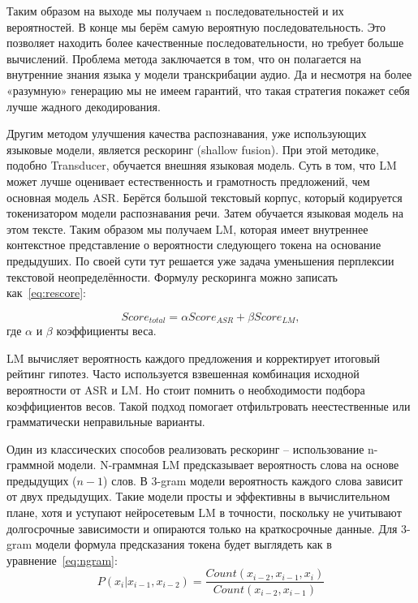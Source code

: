 Таким образом на выходе мы получаем n последовательностей и их вероятностей.
В конце мы берём самую вероятную последовательность.
Это позволяет находить более качественные последовательности, но требует больше вычислений.
Проблема метода заключается в том, что он полагается на внутренние знания языка у модели транскрибации аудио.
Да и несмотря на более «разумную» генерацию мы не имеем гарантий, что такая стратегия покажет себя лучше жадного декодирования.

Другим методом улучшения качества распознавания, уже использующих языковые модели, является рескоринг (shallow fusion)\cite{toshniwal2018comparison}.
При этой методике, подобно Transducer, обучается внешняя языковая модель.
Суть в том, что LM может лучше оценивает естественность и грамотность предложений, чем основная модель ASR.
Берётся большой текстовый корпус, который кодируется токенизатором модели распознавания речи.
Затем обучается языковая модель на этом тексте.
Таким образом мы получаем LM, которая имеет внутреннее контекстное представление о вероятности следующего токена на основание предыдуших.
По своей сути тут решается уже задача уменьшения перплексии текстовой неопределённости.
Формулу рескоринга можно записать как~\ref{eq:rescore}:

\begin{equation}
  Score_{total} = \alpha Score_{ASR} + \beta Score_{LM},
  \label{eq:rescore}
\end{equation}
где $\alpha$ и $\beta$ коэффициенты веса.

LM вычисляет вероятность каждого предложения и корректирует итоговый рейтинг гипотез.
Часто используется взвешенная комбинация исходной вероятности от ASR и LM.
Но стоит помнить о необходимости подбора коэффициентов весов.
Такой подход помогает отфильтровать неестественные или грамматически неправильные варианты.

Один из классических способов реализовать рескоринг -- использование n-граммной модели.
N-граммная LM предсказывает вероятность слова на основе предыдущих ($n-1$) слов.
В 3-gram модели вероятность каждого слова зависит от двух предыдущих.
Такие модели просты и эффективны в вычислительном плане, хотя и уступают нейросетевым LM в точности, поскольку не учитывают долгосрочные зависимости и опираются только на краткосрочные данные.
Для 3-gram модели формула предсказания токена будет выглядеть как в уравнение~\ref{eq:ngram}:
\begin{equation}
  P(x_i|x_{i-1},x_{i-2}) = \frac{Count(x_{i-2}, x_{i-1}, x_{i})}{Count(x_{i-2}, x_{i-1})}
  \label{eq:ngram}
\end{equation}

